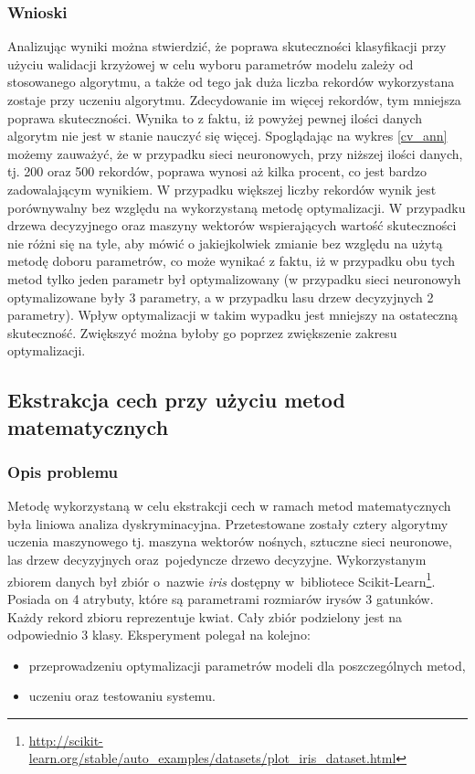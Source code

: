 \subsubsection{Wnioski}
Analizując wyniki można stwierdzić, że poprawa skuteczności klasyfikacji przy użyciu walidacji krzyżowej w celu wyboru parametrów modelu zależy od stosowanego algorytmu, a także od tego jak duża liczba rekordów wykorzystana zostaje przy uczeniu algorytmu. Zdecydowanie im więcej rekordów, tym mniejsza poprawa skuteczności. Wynika to z faktu, iż powyżej pewnej ilości danych algorytm nie jest w stanie nauczyć się więcej. Spoglądając na wykres \ref{cv_ann} możemy zauważyć, że w przypadku sieci neuronowych, przy niższej ilości danych, tj. 200 oraz 500 rekordów, poprawa wynosi aż kilka procent, co jest bardzo zadowalającym wynikiem. W przypadku większej liczby rekordów wynik jest porównywalny bez względu na wykorzystaną metodę optymalizacji. W przypadku drzewa decyzyjnego oraz maszyny wektorów wspierających wartość skuteczności nie różni się na tyle, aby mówić o jakiejkolwiek zmianie bez względu na użytą metodę doboru parametrów, co może wynikać z faktu, iż w przypadku obu tych metod tylko jeden parametr był optymalizowany (w przypadku sieci neuronowyh optymalizowane były 3 parametry, a w przypadku lasu drzew decyzyjnych 2 parametry). Wpływ optymalizacji w takim wypadku jest mniejszy na ostateczną skuteczność. Zwiększyć można byłoby go poprzez zwiększenie zakresu optymalizacji.

\subsection{Ekstrakcja cech przy użyciu metod matematycznych}

\subsubsection{Opis problemu}
Metodę wykorzystaną w celu ekstrakcji cech w ramach metod matematycznych była liniowa analiza dyskryminacyjna. Przetestowane zostały cztery algorytmy uczenia maszynowego tj. maszyna wektorów nośnych, sztuczne sieci neuronowe, las drzew decyzyjnych oraz~pojedyncze drzewo decyzyjne. Wykorzystanym zbiorem danych był zbiór o~nazwie \textit{iris} dostępny w~bibliotece Scikit-Learn\footnote{\url{http://scikit-learn.org/stable/auto_examples/datasets/plot_iris_dataset.html}}. Posiada on 4 atrybuty, które są parametrami rozmiarów irysów 3 gatunków. Każdy rekord zbioru reprezentuje kwiat. Cały zbiór podzielony jest na odpowiednio 3 klasy. Eksperyment polegał na kolejno:
\begin{itemize}

\item przeprowadzeniu optymalizacji parametrów modeli dla poszczególnych metod,
\item uczeniu oraz testowaniu systemu.

\end{itemize}

